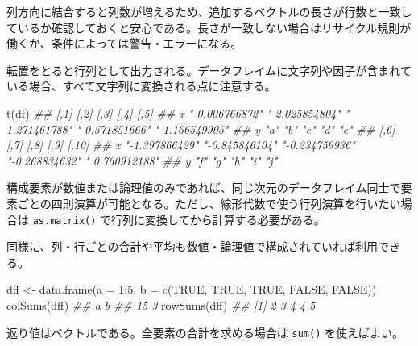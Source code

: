 \documentclass[
  letterpaper,
  xelatex,
  ja=standard, xelatex]{bxjsbook}
\newenvironment{Shaded}{\begin{snugshade}}{\end{snugshade}}
\newcommand{\AttributeTok}[1]{\textcolor[rgb]{0.40,0.45,0.13}{#1}}
\newcommand{\ConstantTok}[1]{\textcolor[rgb]{0.56,0.35,0.01}{#1}}
\newcommand{\DecValTok}[1]{\textcolor[rgb]{0.68,0.00,0.00}{#1}}
\newcommand{\DocumentationTok}[1]{\textcolor[rgb]{0.37,0.37,0.37}{\textit{#1}}}
\newcommand{\FunctionTok}[1]{\textcolor[rgb]{0.28,0.35,0.67}{#1}}
\newcommand{\NormalTok}[1]{\textcolor[rgb]{0.00,0.23,0.31}{#1}}
\newcommand{\OtherTok}[1]{\textcolor[rgb]{0.00,0.23,0.31}{#1}}
\newcommand{\SpecialCharTok}[1]{\textcolor[rgb]{0.37,0.37,0.37}{#1}}
\begin{document}
列方向に結合すると列数が増えるため、追加するベクトルの長さが行数と一致しているか確認しておくと安心である。長さが一致しない場合はリサイクル規則が働くか、条件によっては警告・エラーになる。

転置をとると行列として出力される。データフレイムに文字列や因子が含まれている場合、すべて文字列に変換される点に注意する。

\begin{Shaded}
\begin{Highlighting}[]
\FunctionTok{t}\NormalTok{(df)}
\DocumentationTok{\#\#   [,1]           [,2]           [,3]           [,4]           [,5]          }
\DocumentationTok{\#\# x " 0.006766872" "{-}2.025854804" " 1.271461788" " 0.571851666" " 1.166549905"}
\DocumentationTok{\#\# y "a"            "b"            "c"            "d"            "e"           }
\DocumentationTok{\#\#   [,6]           [,7]           [,8]           [,9]           [,10]         }
\DocumentationTok{\#\# x "{-}1.397866429" "{-}0.845846104" "{-}0.234759936" "{-}0.268834632" " 0.760912188"}
\DocumentationTok{\#\# y "f"            "g"            "h"            "i"            "j"}
\end{Highlighting}
\end{Shaded}

構成要素が数値または論理値のみであれば、同じ次元のデータフレイム同士で要素ごとの四則演算が可能となる。ただし、線形代数で使う行列演算を行いたい場合は
\texttt{as.matrix()} で行列に変換してから計算する必要がある。

同様に、列・行ごとの合計や平均も数値・論理値で構成されていれば利用できる。

\begin{Shaded}
\begin{Highlighting}[]
\NormalTok{dff }\OtherTok{\textless{}{-}} \FunctionTok{data.frame}\NormalTok{(}\AttributeTok{a =} \DecValTok{1}\SpecialCharTok{:}\DecValTok{5}\NormalTok{, }\AttributeTok{b =} \FunctionTok{c}\NormalTok{(}\ConstantTok{TRUE}\NormalTok{, }\ConstantTok{TRUE}\NormalTok{, }\ConstantTok{TRUE}\NormalTok{, }\ConstantTok{FALSE}\NormalTok{, }\ConstantTok{FALSE}\NormalTok{))}
\FunctionTok{colSums}\NormalTok{(dff)}
\DocumentationTok{\#\#  a  b }
\DocumentationTok{\#\# 15  3}
\FunctionTok{rowSums}\NormalTok{(dff)}
\DocumentationTok{\#\# [1] 2 3 4 4 5}
\end{Highlighting}
\end{Shaded}

返り値はベクトルである。全要素の合計を求める場合は \texttt{sum()}
を使えばよい。
\end{document}

